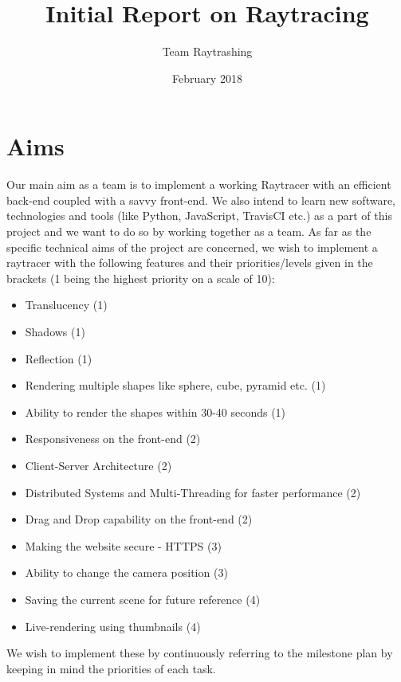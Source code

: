 \title{Initial Report on Raytracing}
\author{Team Raytrashing}
\date{February 2018}



\maketitle

\section{Aims}
Our main aim as a team is to implement a working Raytracer with an efficient back-end coupled with a savvy front-end. We also intend to learn new software, technologies and tools (like Python, JavaScript, TravisCI etc.) as a part of this project and we want to do so by working together as a team. 
As far as the specific technical aims of the project are concerned, we wish to implement a raytracer with the following features and their priorities/levels given in the brackets (1 being the highest priority on a scale of 10):
\begin{itemize}
    \item Translucency (1)
    \item Shadows (1)
    \item Reflection (1)
    \item Rendering multiple shapes like sphere, cube, pyramid etc. (1)
    \item Ability to render the shapes within 30-40 seconds (1)
    \item Responsiveness on the front-end (2)
    \item Client-Server Architecture (2)
    \item Distributed Systems and Multi-Threading for faster performance (2)
    \item Drag and Drop capability on the front-end (2)
    \item Making the website secure - HTTPS (3)
    \item Ability to change the camera position (3)
    \item Saving the current scene for future reference (4)
    \item Live-rendering using thumbnails (4)
\end{itemize}
We wish to implement these by continuously referring to the milestone plan by keeping in mind the priorities of each task.


